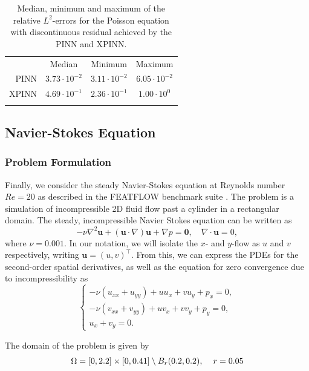 \begin{table}[h!]
\caption{Median, minimum and maximum of the relative $L^2$-errors for the Poisson equation with discontinuous residual achieved by the PINN and XPINN.}
\centering
\begin{tabular}{r|c|c|c}\toprule
     & Median & Minimum & Maximum \\
    \colrule
    PINN & $3.73 \cdot 10^{-2}$ & $3.11 \cdot 10^{-2}$ & $6.05 \cdot 10^{-2}$ \\
    XPINN & $4.69 \cdot 10^{-1} $ &  $2.36 \cdot 10^{-1}$ & $1.00 \cdot 10^{0}$ \\
    \botrule
\end{tabular}
\label{table:discont_poisson}
\end{table}
\vfill\null

\subsection{Navier-Stokes Equation}
\subsubsection{Problem Formulation}
Finally, we consider the steady Navier-Stokes equation at Reynolds number $Re = 20$ as described in the FEATFLOW benchmark suite \cite{DFG}.
The problem is a simulation of incompressible 2D fluid flow past a cylinder in a rectangular domain.
The steady, incompressible Navier Stokes equation can be written as
\begin{equation}\label{eq:NS}
    -\nu \nabla^2 \mathbf{u} + (\mathbf{u} \cdot \nabla)\mathbf{u} + \nabla p = \mathbf{0}, \quad \nabla \cdot \mathbf{u} = 0,
\end{equation}
where $\nu = 0.001$.
In our notation, we will isolate the $x$- and $y$-flow as $u$ and $v$ respectively, writing $\mathbf{u} = (u,v)^\intercal$.
From this, we can express the PDEs for the second-order spatial derivatives, as well as the equation for zero convergence due to incompressibility as
\begin{equation}
\begin{cases}
-\nu(u_{xx} + u_{yy})+uu_x+vu_y+p_x = 0, \\
-\nu(v_{xx} + v_{yy})+uv_x+vv_y+p_y = 0, \\
u_x + v_y = 0.
\end{cases}
\end{equation}

The domain of the problem is given by
\vspace{-1mm}
\begin{align*}
    \Omega = [0,2.2] \times [0,0.41] \setminus B_r(0.2,0.2), \hspace{4mm} r = 0.05
\end{align*}

